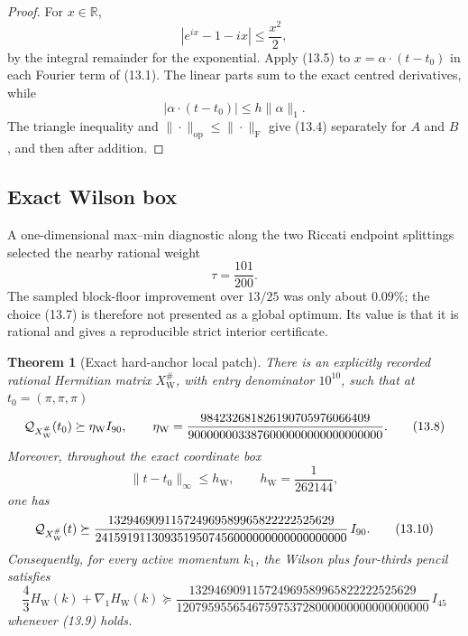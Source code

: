 \documentclass[11pt,oneside]{article}
\newtheorem{theorem}{Theorem}[section]
\theoremstyle{definition}
\theoremstyle{remark}
\begin{document}
\begin{proof}
For \(x\in\mathbb R\),
\[
 |e^{ix}-1-ix|\le\frac{x^2}{2},                           \tag{13.5}
\]
by the integral remainder for the exponential.  Apply (13.5) to
\(x=\alpha\cdot(t-t_0)\) in each Fourier term of (13.1).  The linear
parts sum to the exact centred derivatives, while
\[
 |\alpha\cdot(t-t_0)|
 \le h\|\alpha\|_1.                                      \tag{13.6}
\]
The triangle inequality and
\(\|\cdot\|_{\mathrm{op}}\le\|\cdot\|_{\mathrm F}\) give
(13.4) separately for \(A\) and \(B\), and then after addition.
\end{proof}

\subsection{Exact Wilson box}

A one-dimensional max--min diagnostic along the two Riccati endpoint
splittings selected the nearby rational weight
\[
 \tau=\frac{101}{200}.                                   \tag{13.7}
\]
The sampled block-floor improvement over \(13/25\) was only about
\(0.09\%\); the choice (13.7) is therefore not presented as a global
optimum.  Its value is that it is rational and gives a reproducible
strict interior certificate.

\begin{theorem}[Exact hard-anchor local patch]
\label{thm:newv13-hard-patch}
There is an explicitly recorded rational Hermitian matrix
\(X_{\mathrm W}^{\#}\), with entry denominator \(10^{10}\), such that
at \(t_0=(\pi,\pi,\pi)\)
\[
 {\cal Q}_{X_{\mathrm W}^{\#}}(t_0)
 \succeq
 \eta_{\mathrm W}I_{90},\qquad
 \eta_{\mathrm W}
 =
 \frac{984232681826190705976066409}
 {9000000033876000000000000000000}.                      \tag{13.8}
\]
Moreover, throughout the exact coordinate box
\[
 \|t-t_0\|_\infty\le h_{\mathrm W},
 \qquad h_{\mathrm W}=\frac1{262144},                    \tag{13.9}
\]
one has
\[
 {\cal Q}_{X_{\mathrm W}^{\#}}(t)
 \succeq
 \frac{132946909115724969589965822222525629}
 {2415919113093519507456000000000000000000}\,I_{90}.
                                                               \tag{13.10}
\]
Consequently, for every active momentum \(k_1\), the Wilson plus
four-thirds pencil satisfies
\[
 \frac43H_{\mathrm W}(k)+\nabla_1H_{\mathrm W}(k)
 \succeq
 \frac{132946909115724969589965822222525629}
 {1207959556546759753728000000000000000000}\,I_{45}      \tag{13.11}
\]
whenever (13.9) holds.
\end{theorem}
\end{document}
